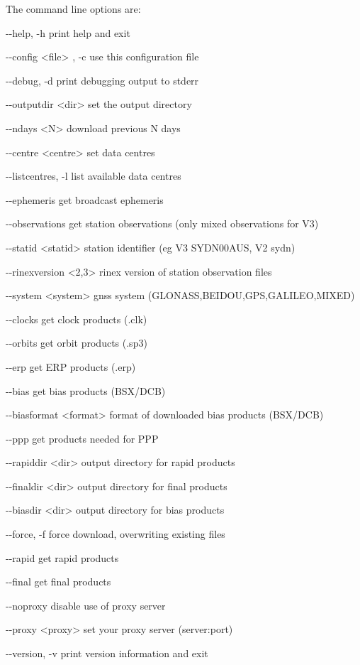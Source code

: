 The command line options are:
\begin{description*}
	\item[-{}-help, -h] print help and exit
	\item[-{}-config \textless{file}\textgreater] , -c use this configuration file
	\item[-{}-debug, -d]           print debugging output to stderr
	\item[-{}-outputdir \textless{dir}\textgreater] set the output directory
	\item[-{}-ndays \textless{N}\textgreater] download previous N days
	
	\item[-{}-centre \textless{centre}\textgreater]       set data centres
	\item[-{}-listcentres, -l]     list available data centres
	\item[-{}-ephemeris]           get broadcast ephemeris
	\item[-{}-observations]        get station observations (only mixed observations for V3)
	\item[-{}-statid \textless{statid}\textgreater]      station identifier (eg V3 SYDN00AUS, V2 sydn)
	\item[-{}-rinexversion \textless{2,3}\textgreater ]  rinex version of station observation files
	\item[-{}-system \textless{system}\textgreater]      gnss system (GLONASS,BEIDOU,GPS,GALILEO,MIXED)
	
	\item[-{}-clocks]              get clock products (.clk)
	\item[-{}-orbits]              get orbit products (.sp3)
	\item[-{}-erp]                 get ERP products (.erp)
	\item[-{}-bias]                get bias products (BSX/DCB)
	\item[-{}-biasformat   \textless{format}\textgreater] format of downloaded bias products (BSX/DCB)
	\item[-{}-ppp]                 get products needed for PPP
	\item[-{}-rapiddir \textless{dir}\textgreater]   output directory for rapid products
  \item[-{}-finaldir \textless{dir}\textgreater]   output directory for final products
  \item[-{}-biasdir  \textless{dir}\textgreater]   output directory for bias products
  \item[-{}-force, -f ]          force download, overwriting existing files
	\item[-{}-rapid]               get rapid products
	\item[-{}-final]               get final products
	
	\item[-{}-noproxy]             disable use of proxy server
	\item[-{}-proxy \textless{proxy}\textgreater]    set your proxy server (server:port)
	\item[-{}-version, -v ]       print version information and exit
\end{description*}

